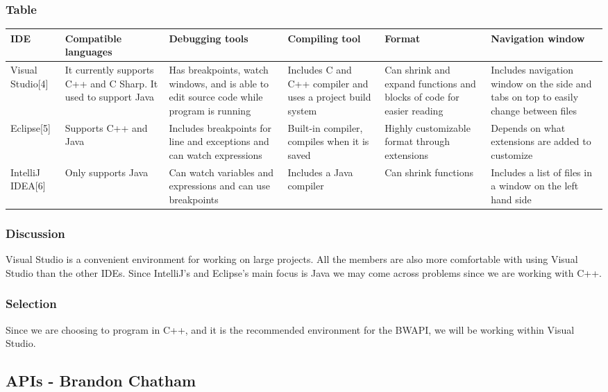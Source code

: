 \subsubsection{Table}
\begin{center}
\begin{tabular}{ ||B|M|M|M|M|M|| } 
\hline
IDE & Compatible languages & Debugging tools & Compiling tool & Format & Navigation window\\
 \hline
 Visual Studio[4] & It currently supports C++ and C Sharp. It used to support Java & Has breakpoints, watch windows, and is able to edit source code while program is running & Includes C and C++ compiler and uses a project build system & Can shrink and expand functions and blocks of code for easier reading & Includes navigation window on the side and tabs on top to easily change between files\\ 
 \hline
 Eclipse[5] & Supports C++ and Java & Includes breakpoints for line and exceptions and can watch expressions & Built-in compiler, compiles when it is saved & Highly customizable format through extensions & Depends on what extensions are added to customize\\ 
 \hline
 IntelliJ IDEA[6] & Only supports Java & Can watch variables and expressions and can use breakpoints & Includes a Java compiler & Can shrink functions & Includes a list of files in a window on the left hand side\\ 
 \hline
\end{tabular}
\end{center}


\subsubsection{Discussion}
Visual Studio is a convenient environment for working on large projects. All the members are also more comfortable with using Visual Studio than the other IDEs. Since IntelliJ's and Eclipse's main focus is Java we may come across problems since we are working with C++.

\subsubsection{Selection}
Since we are choosing to program in C++, and it is the recommended environment for the BWAPI, we will be working within Visual Studio.

\subsection{APIs - Brandon Chatham}
